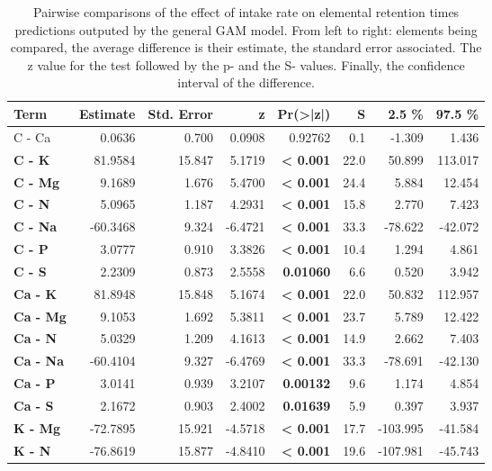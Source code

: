\begin{table}[H]
\centering
\caption{Pairwise comparisons of the effect of intake rate on elemental retention times predictions outputed by the general GAM model. From left to right: elements being compared, the average difference is their estimate, the standard error associated. The z value for the test followed by the p- and the S- values. Finally, the confidence interval of the difference. }
\centering
\begin{tabular}[t]{>{}lrrr>{}rrrr}
\toprule
\textbf{Term} & \textbf{Estimate} & \textbf{Std. Error} & \textbf{z} & \textbf{Pr(>|z|)} & \textbf{S} & \textbf{2.5 \%} & \textbf{97.5 \%}\\
\midrule
C - Ca & 0.0636 & 0.700 & 0.0908 & 0.92762 & 0.1 & -1.309 & 1.436\\
\textbf{C - K} & 81.9584 & 15.847 & 5.1719 & \textbf{< 0.001} & 22.0 & 50.899 & 113.017\\
\textbf{C - Mg} & 9.1689 & 1.676 & 5.4700 & \textbf{< 0.001} & 24.4 & 5.884 & 12.454\\
\textbf{C - N} & 5.0965 & 1.187 & 4.2931 & \textbf{< 0.001} & 15.8 & 2.770 & 7.423\\
\textbf{C - Na} & -60.3468 & 9.324 & -6.4721 & \textbf{< 0.001} & 33.3 & -78.622 & -42.072\\
\textbf{C - P} & 3.0777 & 0.910 & 3.3826 & \textbf{< 0.001} & 10.4 & 1.294 & 4.861\\
\textbf{C - S} & 2.2309 & 0.873 & 2.5558 & \textbf{0.01060} & 6.6 & 0.520 & 3.942\\
\textbf{Ca - K} & 81.8948 & 15.848 & 5.1674 & \textbf{< 0.001} & 22.0 & 50.832 & 112.957\\
\textbf{Ca - Mg} & 9.1053 & 1.692 & 5.3811 & \textbf{< 0.001} & 23.7 & 5.789 & 12.422\\
\textbf{Ca - N} & 5.0329 & 1.209 & 4.1613 & \textbf{< 0.001} & 14.9 & 2.662 & 7.403\\
\textbf{Ca - Na} & -60.4104 & 9.327 & -6.4769 & \textbf{< 0.001} & 33.3 & -78.691 & -42.130\\
\textbf{Ca - P} & 3.0141 & 0.939 & 3.2107 & \textbf{0.00132} & 9.6 & 1.174 & 4.854\\
\textbf{Ca - S} & 2.1672 & 0.903 & 2.4002 & \textbf{0.01639} & 5.9 & 0.397 & 3.937\\
\textbf{K - Mg} & -72.7895 & 15.921 & -4.5718 & \textbf{< 0.001} & 17.7 & -103.995 & -41.584\\
\textbf{K - N} & -76.8619 & 15.877 & -4.8410 & \textbf{< 0.001} & 19.6 & -107.981 & -45.743\\

\end{tabular}
\end{table}
